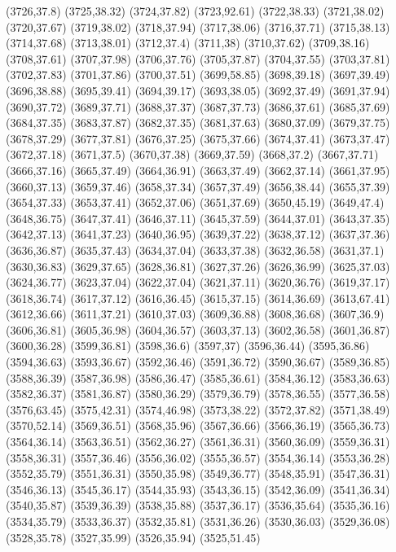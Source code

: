 (3726,37.8)
(3725,38.32)
(3724,37.82)
(3723,92.61)
(3722,38.33)
(3721,38.02)
(3720,37.67)
(3719,38.02)
(3718,37.94)
(3717,38.06)
(3716,37.71)
(3715,38.13)
(3714,37.68)
(3713,38.01)
(3712,37.4)
(3711,38)
(3710,37.62)
(3709,38.16)
(3708,37.61)
(3707,37.98)
(3706,37.76)
(3705,37.87)
(3704,37.55)
(3703,37.81)
(3702,37.83)
(3701,37.86)
(3700,37.51)
(3699,58.85)
(3698,39.18)
(3697,39.49)
(3696,38.88)
(3695,39.41)
(3694,39.17)
(3693,38.05)
(3692,37.49)
(3691,37.94)
(3690,37.72)
(3689,37.71)
(3688,37.37)
(3687,37.73)
(3686,37.61)
(3685,37.69)
(3684,37.35)
(3683,37.87)
(3682,37.35)
(3681,37.63)
(3680,37.09)
(3679,37.75)
(3678,37.29)
(3677,37.81)
(3676,37.25)
(3675,37.66)
(3674,37.41)
(3673,37.47)
(3672,37.18)
(3671,37.5)
(3670,37.38)
(3669,37.59)
(3668,37.2)
(3667,37.71)
(3666,37.16)
(3665,37.49)
(3664,36.91)
(3663,37.49)
(3662,37.14)
(3661,37.95)
(3660,37.13)
(3659,37.46)
(3658,37.34)
(3657,37.49)
(3656,38.44)
(3655,37.39)
(3654,37.33)
(3653,37.41)
(3652,37.06)
(3651,37.69)
(3650,45.19)
(3649,47.4)
(3648,36.75)
(3647,37.41)
(3646,37.11)
(3645,37.59)
(3644,37.01)
(3643,37.35)
(3642,37.13)
(3641,37.23)
(3640,36.95)
(3639,37.22)
(3638,37.12)
(3637,37.36)
(3636,36.87)
(3635,37.43)
(3634,37.04)
(3633,37.38)
(3632,36.58)
(3631,37.1)
(3630,36.83)
(3629,37.65)
(3628,36.81)
(3627,37.26)
(3626,36.99)
(3625,37.03)
(3624,36.77)
(3623,37.04)
(3622,37.04)
(3621,37.11)
(3620,36.76)
(3619,37.17)
(3618,36.74)
(3617,37.12)
(3616,36.45)
(3615,37.15)
(3614,36.69)
(3613,67.41)
(3612,36.66)
(3611,37.21)
(3610,37.03)
(3609,36.88)
(3608,36.68)
(3607,36.9)
(3606,36.81)
(3605,36.98)
(3604,36.57)
(3603,37.13)
(3602,36.58)
(3601,36.87)
(3600,36.28)
(3599,36.81)
(3598,36.6)
(3597,37)
(3596,36.44)
(3595,36.86)
(3594,36.63)
(3593,36.67)
(3592,36.46)
(3591,36.72)
(3590,36.67)
(3589,36.85)
(3588,36.39)
(3587,36.98)
(3586,36.47)
(3585,36.61)
(3584,36.12)
(3583,36.63)
(3582,36.37)
(3581,36.87)
(3580,36.29)
(3579,36.79)
(3578,36.55)
(3577,36.58)
(3576,63.45)
(3575,42.31)
(3574,46.98)
(3573,38.22)
(3572,37.82)
(3571,38.49)
(3570,52.14)
(3569,36.51)
(3568,35.96)
(3567,36.66)
(3566,36.19)
(3565,36.73)
(3564,36.14)
(3563,36.51)
(3562,36.27)
(3561,36.31)
(3560,36.09)
(3559,36.31)
(3558,36.31)
(3557,36.46)
(3556,36.02)
(3555,36.57)
(3554,36.14)
(3553,36.28)
(3552,35.79)
(3551,36.31)
(3550,35.98)
(3549,36.77)
(3548,35.91)
(3547,36.31)
(3546,36.13)
(3545,36.17)
(3544,35.93)
(3543,36.15)
(3542,36.09)
(3541,36.34)
(3540,35.87)
(3539,36.39)
(3538,35.88)
(3537,36.17)
(3536,35.64)
(3535,36.16)
(3534,35.79)
(3533,36.37)
(3532,35.81)
(3531,36.26)
(3530,36.03)
(3529,36.08)
(3528,35.78)
(3527,35.99)
(3526,35.94)
(3525,51.45)
